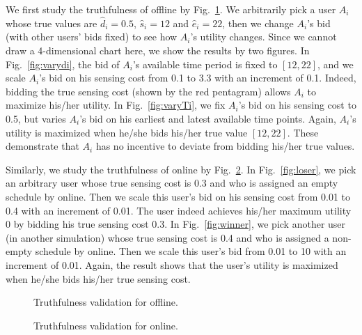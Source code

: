 \documentclass[10pt,journal,compsoc]{IEEEtran}
\begin{document}
    We first study the truthfulness of \textsf{offline} by Fig.~\ref{fig:offlinetuthfulness}. We arbitrarily pick a user $A_i$ whose true values are $\hat{d}_i=0.5$, $\hat{s}_i=12$ and $\hat{e}_i=22$, then we change $A_i$'s bid (with other users' bids fixed) to see how $A_i$'s utility changes. Since we cannot draw a 4-dimensional chart here, we show the results by two figures. In Fig.~\ref{fig:varydi}, the bid of $A_i$'s available time period is fixed to $[12,22]$, and we scale $A_i$'s bid on his sensing cost from 0.1 to 3.3 with an increment of 0.1. Indeed, bidding the true sensing cost (shown by the red pentagram) allows $A_i$ to maximize his/her utility. In Fig.~\ref{fig:varyTi}, we fix $A_i$'s bid on his sensing cost to 0.5, but varies $A_i$'s bid on his earliest and latest available time points. Again, $A_i$'s utility is maximized when he/she bids his/her true value $[12,22]$. These demonstrate that $A_i$ has no incentive to deviate from bidding his/her true values.

    Similarly, we study the truthfulness of \textsf{online} by Fig.~\ref{fig:onlinetruthfulness}. In Fig.~\ref{fig:loser}, we pick an arbitrary user whose true sensing cost is 0.3 and who is assigned an empty schedule by \textsf{online}. Then we scale this user's bid on his sensing cost from 0.01 to 0.4 with an increment of 0.01. The user indeed achieves his/her maximum utility 0 by bidding his true sensing cost 0.3. In Fig.~\ref{fig:winner}, we pick another user (in another simulation) whose true sensing cost is 0.4 and who is assigned a non-empty schedule by \textsf{online}. Then we scale this user's bid from 0.01 to 10 with an increment of 0.01. Again, the result shows that the user's utility is maximized when he/she bids his/her true sensing cost.
\begin{figure}[htb]
\begin{center}
        \end{center} \vspace{-1ex}
        \caption{Truthfulness validation for \textsf{offline}.}
      \label{fig:offlinetuthfulness} \vspace{-2ex}
      \end{figure}
\begin{figure}[htb]
\begin{center}
        \end{center} \vspace{-1ex}
        \caption{Truthfulness validation for \textsf{online}.}
      \label{fig:onlinetruthfulness} \vspace{-2ex}
      \end{figure}
\end{document}
